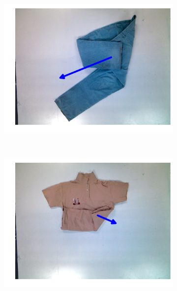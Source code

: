 \begin{figure}[htbp]
\begin{subfigure}[l]{0.49\textwidth}
    	\includegraphics[width=\textwidth]
    	{figures/pnp/pants19-direction.pdf}
	\end{subfigure}
	~
    \begin{subfigure}[r]{0.49\textwidth}
	    \centering
    	\includegraphics[width=\textwidth]
    	{figures/pnp/polo18-direction.pdf}
	\end{subfigure}
	~
	\begin{subfigure}[l]{0.49\textwidth}
	    \centering

\end{subfigure}
\end{figure}
